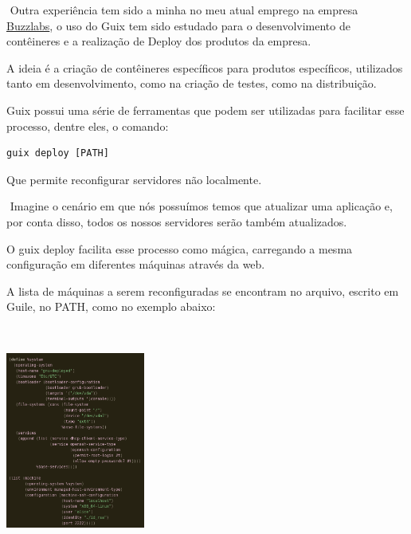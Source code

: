 \documentclass[bigger]{beamer}
\begin{document}
\begin{frame}[label={sec:org23de719},fragile]{⁤}
 Outra experiência tem sido a minha no meu atual emprego na empresa \href{https://www.buzzlabs.com.br/}{Buzzlabs}, o uso do Guix tem sido estudado
para o desenvolvimento de contêineres e a realização de Deploy dos produtos da empresa.

A ideia é a criação de contêineres específicos para produtos específicos, utilizados tanto em desenvolvimento,
como na criação de testes, como na distribuição.

Guix possui uma série de ferramentas que podem ser utilizadas para facilitar esse processo, dentre eles, o
comando:
\begin{verbatim}
guix deploy [PATH]
\end{verbatim}
Que permite reconfigurar servidores não localmente.
\end{frame}
\begin{frame}[label={sec:orge439b77}]{⁤}
Imagine o cenário em que nós possuímos temos que atualizar uma aplicação e, por conta disso, todos os nossos
servidores serão também atualizados.

O guix deploy facilita esse processo como mágica, carregando a mesma configuração em diferentes máquinas
através da web.

A lista de máquinas a serem reconfiguradas se encontram no arquivo, escrito em Guile, no PATH, como no exemplo
abaixo:
\end{frame}
\begin{frame}[label={sec:orge50abd4}]{⁤}
\begin{center}
\includegraphics[height=220]{./Deploy.png}
\end{center}
\end{frame}
\end{document}
